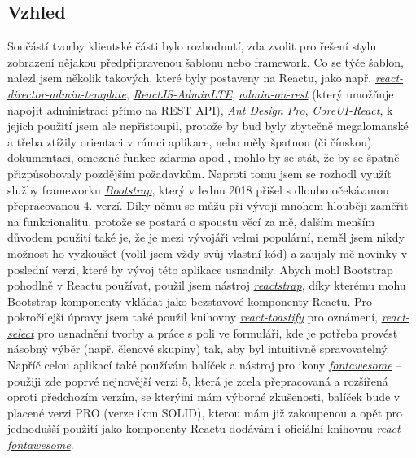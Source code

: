    \subsection{Vzhled}
    Součástí tvorby klientské části bylo rozhodnutí, zda zvolit pro řešení stylu zobrazení nějakou předpřipravenou šablonu nebo framework. Co se týče šablon, nalezl jsem několik takových, které byly postaveny na Reactu, jako např. \href{https://github.com/MacKentoch/react-director-admin-template}{\textit{react-director-admin-template}}, \href{https://github.com/booleanhunter/ReactJS-AdminLTE}{\textit{ReactJS-AdminLTE}},
    \href{https://github.com/marmelab/admin-on-rest}{\textit{admin-on-rest}} (který umožňuje napojit administraci přímo na REST API),
    \href{https://github.com/ant-design/ant-design-pro/}{\textit{Ant Design Pro}},
    \href{https://github.com/mrholek/CoreUI-React}{\textit{CoreUI-React}}, k jejich použití jsem ale nepřistoupil, protože by buď byly zbytečně megalomanské a třeba ztížily orientaci v rámci aplikace, nebo měly špatnou (či čínskou) dokumentaci, omezené funkce zdarma apod., mohlo by se stát, že by se špatně přizpůsobovaly pozdějším požadavkům. Naproti tomu jsem se rozhodl využít služby frameworku \href{https://getbootstrap.com}{\textit{Bootstrap}}, který v lednu 2018 přišel s dlouho očekávanou přepracovanou 4. verzí. Díky němu se můžu při vývoji mnohem hlouběji zaměřit na funkcionalitu, protože se postará o spoustu věcí za mě, dalším menším důvodem použití také je, že je mezi vývojáři velmi populární, neměl jsem nikdy možnost ho vyzkoušet (volil jsem vždy svůj vlastní kód) a zaujaly mě novinky v poslední verzi, které by vývoj této aplikace usnadnily. Abych mohl Bootstrap pohodlně v Reactu používat, použil jsem nástroj \href{https://github.com/reactstrap/reactstrap}{\textit{reactstrap}}, díky kterému mohu Bootstrap komponenty vkládat jako bezstavové komponenty Reactu. Pro pokročilejší úpravy jsem také použil knihovny \href{https://github.com/fkhadra/react-toastify}{\textit{react-toastify}} pro oznámení, \href{https://github.com/JedWatson/react-select}{\textit{react-select}} pro usnadnění tvorby a práce s poli ve formuláři, kde je potřeba provést násobný výběr (např. členové skupiny) tak, aby byl intuitivně spravovatelný. Napříč celou aplikací také používám balíček a nástroj pro ikony \href{https://fontawesome.com/}{\textit{fontawesome}} -- použiji zde poprvé nejnovější verzi 5, která je zcela přepracovaná a rozšířená oproti předchozím verzím, se kterými mám výborné zkušenosti, balíček bude v placené verzi PRO (verze ikon SOLID), kterou mám již zakoupenou a opět pro jednodušší použití jako komponenty Reactu dodávám i oficiální knihovnu \href{https://github.com/FortAwesome/react-fontawesome}{\textit{react-fontawesome}}.
    
